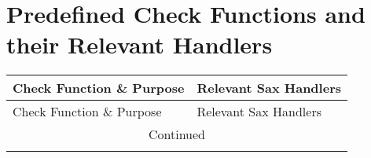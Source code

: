 \documentclass[12pt]{report}
\begin{document}
\appendix
\appendixpage
\addappheadtotoc

\chapter{Predefined Check Functions and their Relevant Handlers}
 \label{predefinedChecksFunctions}
\newcommand{\saxColSize}{6cm}
\newcommand{\vertSize}{3mm}

\begin{longtable}{p{10cm} p{\saxColSize}}
\toprule
Check Function \& Purpose & Relevant Sax Handlers \\ \midrule
\endfirsthead
\toprule
Check Function \& Purpose & Relevant Sax Handlers \\ \midrule
\endhead
\hline
\multicolumn{2}{c}{Continued}\\
\bottomrule
\endfoot
\bottomrule
\endlastfoot


\end{longtable}
\end{document}
